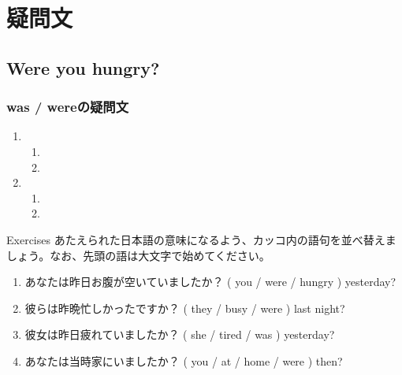 \documentclass[aspectratio=169,xcolor={dvipsnames,table}]{beamer}
\begin{document}
\section{疑問文}
\subsection{Were you hungry?}
\begin{frame}[plain]\frametitle{was / wereの疑問文}
\Large

\begin{enumerate}
 \item \begin{enumerate}\Large
	\item {}
	\item {}
       \end{enumerate}
 \item \begin{enumerate}\Large
	\item {}
	\item {}
       \end{enumerate}
\end{enumerate}

\end{frame}


\begin{frame}[plain]{Exercises}
あたえられた日本語の意味になるよう、カッコ内の語句を並べ替えましょう。なお、先頭の語は大文字で始めてください。 
 \begin{enumerate}
	    \item あなたは昨日お腹が空いていましたか？
( you / were / hungry ) yesterday?\\
    \item 彼らは昨晩忙しかったですか？
( they / busy / were ) last night?\\
	    \item 彼女は昨日疲れていましたか？
( she / tired / was ) yesterday?\\
	    \item あなたは当時家にいましたか？
( you / at / home / were ) then?\\

	  
 \end{enumerate}
\end{frame}
\end{document}

